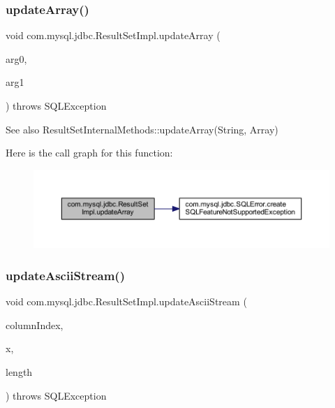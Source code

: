 \subsubsection{\texorpdfstring{update\+Array()}{updateArray()}\hspace{0.1cm}{\footnotesize\ttfamily [2/2]}}
{\footnotesize\ttfamily void com.\+mysql.\+jdbc.\+Result\+Set\+Impl.\+update\+Array (\begin{DoxyParamCaption}\item[{String}]{arg0,  }\item[{Array}]{arg1 }\end{DoxyParamCaption}) throws S\+Q\+L\+Exception}

\begin{DoxySeeAlso}{See also}
Result\+Set\+Internal\+Methods\+::update\+Array(\+String, Array) 
\end{DoxySeeAlso}
Here is the call graph for this function\+:
\nopagebreak
\begin{figure}[H]
\begin{center}
\leavevmode
\includegraphics[width=350pt]{classcom_1_1mysql_1_1jdbc_1_1_result_set_impl_ac90a5310bf41f46bb61af696f0db1cfc_cgraph}
\end{center}
\end{figure}
\mbox{\label{classcom_1_1mysql_1_1jdbc_1_1_result_set_impl_a7d210c70de89ca540597a70d1f9f086a}} 
\subsubsection{\texorpdfstring{update\+Ascii\+Stream()}{updateAsciiStream()}\hspace{0.1cm}{\footnotesize\ttfamily [1/2]}}
{\footnotesize\ttfamily void com.\+mysql.\+jdbc.\+Result\+Set\+Impl.\+update\+Ascii\+Stream (\begin{DoxyParamCaption}\item[{int}]{column\+Index,  }\item[{java.\+io.\+Input\+Stream}]{x,  }\item[{int}]{length }\end{DoxyParamCaption}) throws S\+Q\+L\+Exception}

